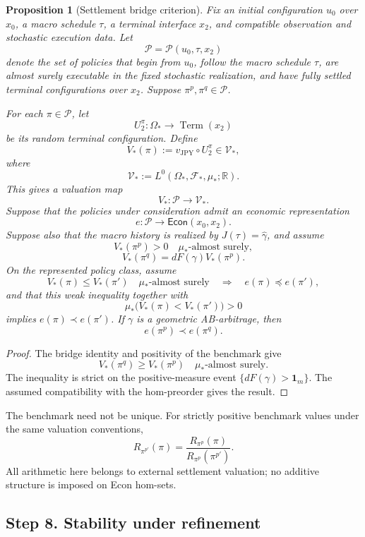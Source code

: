 \documentclass[11pt,a4paper]{article}
\newtheorem{proposition}[definition]{Proposition}
\newcommand{\Econ}{\mathsf{Econ}}
\begin{document}
\begin{proposition}[Settlement bridge criterion]
Fix an initial configuration \(u_0\) over \(x_0\), a macro
schedule \(\tau\), a terminal interface \(x_2\), and compatible
observation and stochastic execution data. Let
\[
  \mathcal P=\mathcal P(u_0,\tau,x_2)
\]
denote the set of policies that begin from $u_0$, follow the macro schedule
$\tau$, are almost surely executable in the fixed stochastic realization,
and have fully settled terminal configurations over $x_2$. Suppose
$\pi^p,\pi^q\in\mathcal P$.

For each \(\pi\in\mathcal P\), let
\[
  U_2^\pi:\Omega_*\longrightarrow\operatorname{Term}(x_2)
\]
be its random terminal configuration. Define
\[
  V_*(\pi)
  :=
  v_{\mathrm{JPY}}\circ U_2^\pi
  \in
  \mathcal V_*,
\]
where
\[
  \mathcal V_*
  :=
  L^0(\Omega_*,\mathcal F_*,\mu_*;\mathbb R).
\]
This gives a valuation map
\[
  V_*:\mathcal P\longrightarrow\mathcal V_*.
\]
Suppose that the policies under consideration admit an
economic representation
\[
  e:\mathcal P\longrightarrow\Econ(x_0,x_2).
\]
Suppose also that the macro history is realized by
$J(\tau)=\widehat\gamma$, and assume
\[
  V_*(\pi^p)>0\quad\mu_*\text{-almost surely},
\]
\[
  V_*(\pi^q)=dF(\gamma)V_*(\pi^p).
\]
On the represented policy class, assume
\[
  V_*(\pi)\leq V_*(\pi')
  \quad\mu_*\text{-almost surely}
  \quad\Longrightarrow\quad
  e(\pi)\preceq e(\pi'),
\]
and that this weak inequality together with
\[
  \mu_*\bigl(V_*(\pi)<V_*(\pi')\bigr)>0
\]
implies $e(\pi)\prec e(\pi')$.
If $\gamma$ is a geometric AB-arbitrage, then
\[
  e(\pi^p)\prec e(\pi^q).
\]
\end{proposition}

\begin{proof}
The bridge identity and positivity of the benchmark give
\[
  V_*(\pi^q)\geq V_*(\pi^p)
  \quad\mu_*\text{-almost surely}.
\]
The inequality is strict on the positive-measure event
$\{dF(\gamma)>\mathbf1_m\}$.
The assumed compatibility with the hom-preorder gives the result.
\end{proof}

The benchmark need not be unique.
For strictly positive benchmark values under the same valuation
conventions,
\[
  R_{\pi^{p'}}(\pi)
  =
  \frac{R_{\pi^p}(\pi)}
       {R_{\pi^p}(\pi^{p'})}.
\]
All arithmetic here belongs to external settlement valuation;
no additive structure is imposed on Econ hom-sets.

\subsection{Step 8. Stability under refinement}
\end{document}

